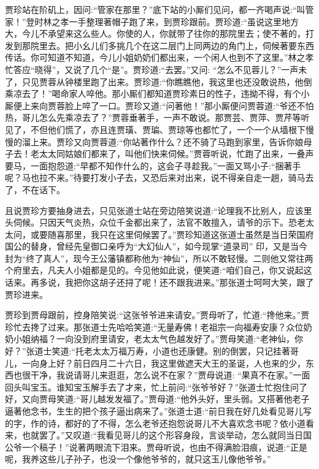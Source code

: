\begin{parag}
    贾珍站在阶矶上，因问:“管家在那里？”底下站的小厮们见问，都一齐喝声说:“叫管家！”登时林之孝一手整理著帽子跑了来，到贾珍跟前。贾珍道:“虽说这里地方大，今儿不承望来这么些人。你使的人，你就带了往你的那院里去；使不著的，打发到那院里去。把小幺儿们多挑几个在这二层门上同两边的角门上，伺候著要东西传话。你可知道不知道，今儿小姐奶奶们都出来，一个闲人也到不了这里。”林之孝忙答应“晓得”，又说了几个“是”。贾珍道:“去罢。”又问: “怎么不见蓉儿？”一声未了，只见贾蓉从钟楼里跑了出来。贾珍道:“你瞧瞧他，我这里也还没敢说热，他倒乘凉去了！”喝命家人啐他。那小厮们都知道贾珍素日的性子，违拗不得，有个小厮便上来向贾蓉脸上啐了一口。贾珍又道:“问著他！”那小厮便问贾蓉道:“爷还不怕热，哥儿怎么先乘凉去了？”贾蓉垂著手，一声不敢说。那贾芸、贾萍、贾芹等听见了，不但他们慌了，亦且连贾璜、贾㻞、贾琼等也都忙了，一个一个从墙根下慢慢的溜上来。贾珍又向贾蓉道:“你站著作什么？还不骑了马跑到家里，告诉你娘母子去！老太太同姑娘们都来了，叫他们快来伺候。”贾蓉听说，忙跑了出来，一叠声要马，一面抱怨道:“早都不知作什么的，这会子寻趁我。”一面又骂小子:“捆著手呢？马也拉不来。”待要打发小子去，又恐后来对出来，说不得亲自走一趟，骑马去了，不在话下。
\end{parag}


\begin{parag}
    且说贾珍方要抽身进去，只见张道士站在旁边陪笑说道:“论理我不比别人，应该里头伺候。只因天气炎热，众位千金都出来了，法官不敢擅入，请爷的示下。恐老太太问，或要随喜那里，我只在这里伺候罢了。”贾珍知道这张道士虽然是当日荣国府国公的替身，曾经先皇御口亲呼为“大幻仙人”，如今现掌“道录司” 印，又是当今封为“终了真人”，现今王公藩镇都称他为“神仙”，所以不敢轻慢。二则他又常往两个府里去，凡夫人小姐都是见的。今见他如此说，便笑道:“咱们自己，你又说起这话来。再多说，我把你这胡子还挦了呢！还不跟我进来。”那张道士呵呵大笑，跟了贾珍进来。
\end{parag}


\begin{parag}
    贾珍到贾母跟前，控身陪笑说:“这张爷爷进来请安。”贾母听了，忙道:“搀他来。”贾珍忙去搀了过来。那张道士先哈哈笑道:“无量寿佛！老祖宗一向福寿安康？众位奶奶小姐纳福？一向没到府里请安，老太太气色越发好了。”贾母笑道:“老神仙，你好？”张道士笑道:“托老太太万福万寿，小道也还康健。别的倒罢，只记挂著哥儿，一向身上好？前日四月二十六日，我这里做遮天大王的圣诞，人也来的少，东西也很干净，我说请哥儿来逛逛，怎么说不在家？”贾母说道: “果真不在家。”一面回头叫宝玉。谁知宝玉解手去了才来，忙上前问:“张爷爷好？”张道士忙抱住问了好，又向贾母笑道:“哥儿越发发福了。”贾母道:“他外头好，里头弱。又搭著他老子逼著他念书，生生的把个孩子逼出病来了。”张道士道:“前日我在好几处看见哥儿写的字，作的诗，都好的了不得，怎么老爷还抱怨说哥儿不大喜欢念书呢？依小道看来，也就罢了。”又叹道:“我看见哥儿的这个形容身段，言谈举动，怎么就同当日国公爷一个稿子！”说著两眼流下泪来。贾母听说，也由不得满脸泪痕，说道:“正是呢，我养这些儿子孙子，也没一个像他爷爷的，就只这玉儿像他爷爷。”
\end{parag}


